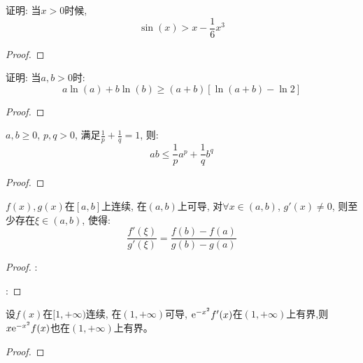 \begin{example}
    证明: 当$x > 0$时候, 
    \begin{equation*}
        \sin(x) > x - \frac{1}{6}x^3
    \end{equation*}
\end{example}
\begin{proof}
    
\end{proof}

\begin{example}
    证明: 当$a, b > 0$时:
    \begin{equation*}
        a\ln(a) + b\ln(b) \ge (a+b)[\ln(a+b) - \ln2]
    \end{equation*}
\end{example}
\begin{proof}
    
\end{proof}

\begin{example}
    $a, b \ge 0$, $p, q > 0$, 满足$\frac{1}{p} + \frac{1}{q} = 1$, 则:
    \begin{equation*}
        ab \le \frac{1}{p}a^p + \frac{1}{q}b^q
    \end{equation*}    
\end{example}
\begin{proof}

\end{proof}

\begin{theorem}[Cauchy中值定理]\label{theorem:Cauchy-mean-value}
    $f(x), g(x)$在$[a, b]$上连续, 在$(a, b)$上可导, 对$\forall x \in (a, b)$, $g'(x) \neq 0$, 则至少存在$\xi \in (a, b)$, 使得:
    \begin{equation*}
        \frac{f'(\xi)}{g'(\xi)} = \frac{f(b)-f(a)}{g(b) - g(a)}
    \end{equation*}
\end{theorem}
\begin{proof}
    :

    :

\end{proof}

\begin{example}
    设$f(x)$在$[1, +\infty)$连续, 在$(1, +\infty)$可导, $\mathrm{e}^{-x^2}f'(x)$在$(1, +\infty)$上有界,则$x\mathrm{e}^{-x^2}f(x)$也在$(1, +\infty)$上有界。
\end{example}
\begin{proof}
    
\end{proof}